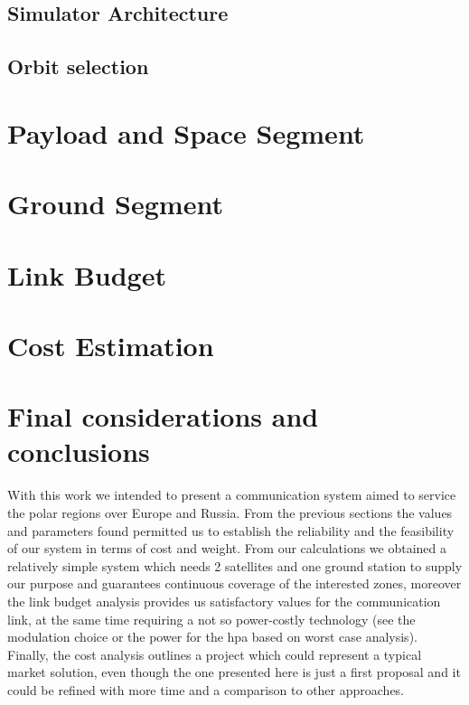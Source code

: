 \documentclass[11pt,a4paper,titlepage]{article}
\begin{document}
	\subsection{Simulator Architecture}\label{sec:simulator}
		
	\subsection{Orbit selection}
		

\section{Payload and Space Segment}
	
\section{Ground Segment}\label{sec:ground_segment}
	

\section{Link Budget}
	

\section{Cost Estimation}
	

\section{Final considerations and conclusions}
	With this work we intended to present a communication system aimed to service the polar regions over Europe and Russia. From the previous sections the values and parameters found permitted us to establish the reliability and the feasibility of our system in terms of cost and weight. From our calculations we obtained a relatively simple system which needs 2 satellites and one ground station to supply our purpose and guarantees continuous coverage of the interested zones, moreover the link budget analysis provides us satisfactory values for the communication link, at the same time requiring a not so power-costly technology (see the modulation choice or the power for the \gls{hpa} based on worst case analysis). Finally, the cost analysis outlines a project which could represent a typical market solution, even though the one presented here is just a first proposal and it could be refined with more time and a comparison to other approaches.



\end{document}
